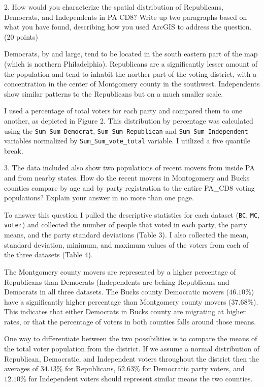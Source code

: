\documentclass[]{article}
\begin{document}
2. How would you characterize the spatial distribution of Republicans,
Democrats, and Independents in PA CD8? Write up two paragraphs based on
what you have found, describing how you used ArcGIS to address the
question. (20 points)

Democrats, by and large, tend to be located in the south eastern part of
the map (which is northern Philadelphia). Republicans are a
significantly lesser amount of the population and tend to inhabit the
norther part of the voting district, with a concentration in the center
of Montgomery county in the southwest. Independents show similar
patterns to the Republicans but on a much smaller scale.

I used a percentage of total voters for each party and compared them to
one another, as depicted in Figure 2. This distribution by percentage
was calculated using the \texttt{Sum\_Sum\_Democrat},
\texttt{Sum\_Sum\_Republican} and \texttt{Sum\_Sum\_Independent}
variables normalized by \texttt{Sum\_Sum\_vote\_total} variable. I
utilized a five quantile break.

3. The data included also show two populations of recent movers from
inside PA and from nearby states. How do the recent movers in
Montogomery and Bucks counties compare by age and by party registration
to the entire PA\_CD8 voting populations? Explain your answer in no more
than one page.

To answer this question I pulled the descriptive statistics for each
dataset (\texttt{BC}, \texttt{MC}, \texttt{voter}) and collected the
number of people that voted in each party, the party means, and the
party standard deviations (Table 3). I also collected the mean, standard
deviation, minimum, and maximum values of the voters from each of the
three datasets (Table 4).

The Montgomery county movers are represented by a higher percentage of
Republicans than Democrats (Independents are behing Republicans and
Democrats in all three datasets. The Bucks county Democratic movers
(\(46.10\%\)) have a significantly higher percentage than Montgomery
county movers (\(37.68\%\)). This indicates that either Democrats in
Bucks county are migrating at higher rates, or that the percentage of
voters in both counties falls around those means.

One way to differentiate between the two possibilities is to compare the
means of the total voter population from the district. If we assume a
normal distribution of Republican, Democratic, and Independent voters
throughout the district then the averages of \(34.13\%\) for
Republicans, \(52.63\%\) for Democratic party voters, and \(12.10\%\)
for Independent voters should represent similar means the two counties.
\end{document}
